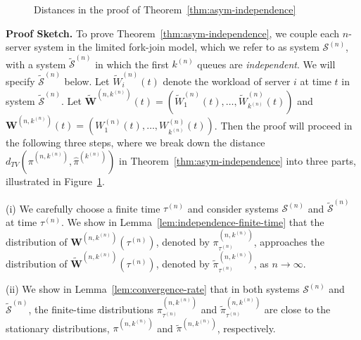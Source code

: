 \documentclass[sigconf]{acmart}
\newcommand{\supn}{^{(n)}}
\begin{document}
\begin{figure}
\centering
{}
\caption{Distances in the proof of Theorem~\ref{thm:asym-independence}}
\label{fig:distances}
\end{figure}
\textbf{Proof Sketch.}
To prove Theorem~\ref{thm:asym-independence}, we couple each $n$-server system in the limited fork-join model, which we refer to as system $\mathcal{S}\supn$, with a system $\widetilde{\mathcal{S}}\supn$ in which the first $k\supn$ queues are \emph{independent}. We will specify $\widetilde{\mathcal{S}}\supn$ below.  Let $\widetilde{W}\supn_i(t)$ denote the workload of server $i$ at time $t$ in system $\widetilde{\mathcal{S}}\supn$. Let $\widetilde{\bm{W}}^{(n,k\supn)}(t)=\left(\widetilde{W}\supn_1(t),\dots,\widetilde{W}\supn_{k\supn}(t)\right)$ and $\bm{W}^{(n,k\supn)}(t)=\left(W\supn_1(t),\dots,W\supn_{k\supn}(t)\right)$. Then the proof will proceed in the following three steps, where we break down the distance $d_{TV}\left(\pi^{(n,k\supn)},\hat{\pi}^{(k\supn)}\right)$ in Theorem~\ref{thm:asym-independence} into three parts, illustrated in Figure~\ref{fig:distances}.

(i) We carefully choose a finite time $\tau\supn$ and consider systems $\mathcal{S}\supn$ and $\widetilde{\mathcal{S}}\supn$ at time $\tau\supn$.  We show in Lemma~\ref{lem:independence-finite-time} that the distribution of $\bm{W}^{(n,k\supn)}(\tau\supn)$, denoted by $\pi_{\tau\supn}^{(n,k\supn)}$, approaches the distribution of $\widetilde{\bm{W}}^{(n,k\supn)}(\tau\supn)$, denoted by $\widetilde{\pi}_{\tau\supn}^{(n,k\supn)}$, as $n\to\infty$.

(ii) We show in Lemma~\ref{lem:convergence-rate} that in both systems $\mathcal{S}\supn$ and $\widetilde{\mathcal{S}}\supn$, the finite-time distributions $\pi_{\tau\supn}^{(n,k\supn)}$ and $\widetilde{\pi}_{\tau\supn}^{(n,k\supn)}$ are close to the stationary distributions, $\pi^{(n,k\supn)}$ and $\widetilde{\pi}^{(n,k\supn)}$, respectively.
\end{document}
